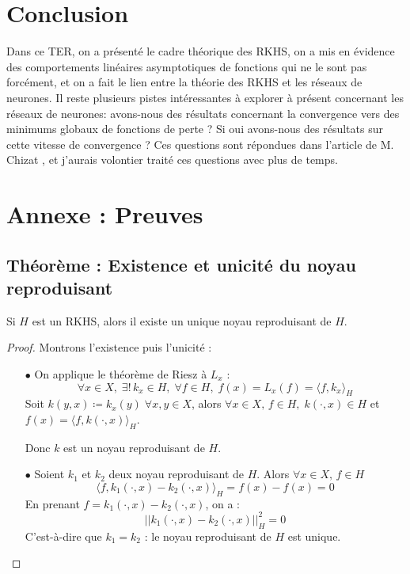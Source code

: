 \documentclass[a4paper, 11pt, french]{article}
\theoremstyle{definition}
\begin{document}
	\section{Conclusion}
	
	Dans ce TER, on a présenté le cadre théorique des RKHS, on a mis en évidence des comportements linéaires asymptotiques de fonctions qui ne le sont pas forcément, et on a fait le lien entre la théorie des RKHS et les réseaux de neurones. Il reste plusieurs pistes intéressantes à explorer à présent concernant les réseaux de neurones: avons-nous des résultats concernant la convergence vers des minimums globaux de fonctions de perte ? Si oui avons-nous des résultats sur cette vitesse de convergence ? Ces questions sont répondues dans l'article de M. Chizat \cite{chizat}, et j'aurais volontier traité ces questions avec plus de temps.
	
	\newpage
	
	\section{Annexe : Preuves}

	\subsection{Théorème : Existence et unicité du noyau reproduisant}
	
	Si $H$ est un RKHS, alors il existe un unique noyau reproduisant de $H$.
	
	\begin{proof}
		Montrons l'existence puis l'unicité : \\
		\begin{itemize} 
			\item[$\bullet$]
			On applique le théorème de Riesz à $L_x$ :
			\[\forall x \in X, \; \exists ! \, k_x \in H, \; \forall f \in H, \; f(x) = L_x (f) = \langle f, k_x \rangle_H\]
			Soit $k(y, x) \coloneqq k_x(y) \; \forall x,y \in X$, alors $\forall x \in X, \, f \in H, \; k(\cdot, x) \in H$ et  $f(x) = \langle f, k(\cdot, x) \rangle_H$.
			
			Donc $k$ est un noyau reproduisant de $H$.
			
			\item[$\bullet$]
			Soient $k_1$ et $k_2$ deux noyau reproduisant de $H$. Alors $\forall x \in X, \, f \in H$
			\[\langle f, k_1(\cdot, x) - k_2(\cdot, x) \rangle_H = f(x) - f(x) = 0\]
			En prenant $f = k_1(\cdot, x) - k_2(\cdot, x)$, on a :
			\[\left|\left| k_1(\cdot, x) - k_2(\cdot, x) \right|\right|_H^2 = 0\]
			C'est-à-dire que $k_1 = k_2$ : le noyau reproduisant de $H$ est unique.
		\end{itemize}
	\end{proof}
\end{document}
